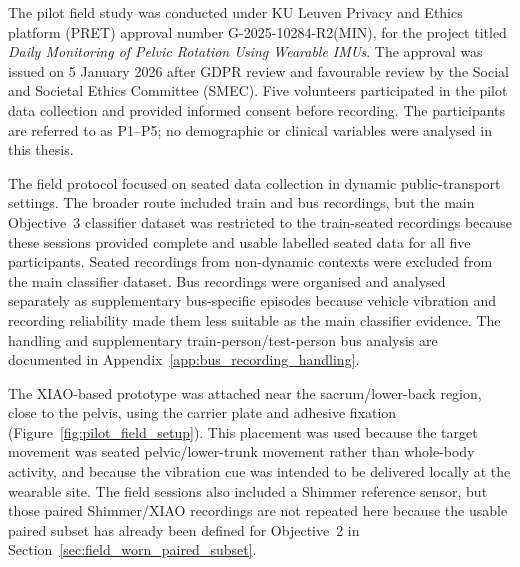The pilot field study was conducted under KU Leuven Privacy and Ethics platform (PRET) approval number G-2025-10284-R2(MIN), for the project titled \emph{Daily Monitoring of Pelvic Rotation Using Wearable IMUs}. The approval was issued on 5 January 2026 after GDPR review and favourable review by the Social and Societal Ethics Committee (SMEC). Five volunteers participated in the pilot data collection and provided informed consent before recording. The participants are referred to as P1--P5; no demographic or clinical variables were analysed in this thesis.

The field protocol focused on seated data collection in dynamic public-transport settings. The broader route included train and bus recordings, but the main Objective~3 classifier dataset was restricted to the train-seated recordings because these sessions provided complete and usable labelled seated data for all five participants. Seated recordings from non-dynamic contexts were excluded from the main classifier dataset. Bus recordings were organised and analysed separately as supplementary bus-specific episodes because vehicle vibration and recording reliability made them less suitable as the main classifier evidence. The handling and supplementary train-person/test-person bus analysis are documented in Appendix~\ref{app:bus_recording_handling}.

The XIAO-based prototype was attached near the sacrum/lower-back region, close to the pelvis, using the carrier plate and adhesive fixation (Figure~\ref{fig:pilot_field_setup}). This placement was used because the target movement was seated pelvic/lower-trunk movement rather than whole-body activity, and because the vibration cue was intended to be delivered locally at the wearable site. The field sessions also included a Shimmer reference sensor, but those paired Shimmer/XIAO recordings are not repeated here because the usable paired subset has already been defined for Objective~2 in Section~\ref{sec:field_worn_paired_subset}.

